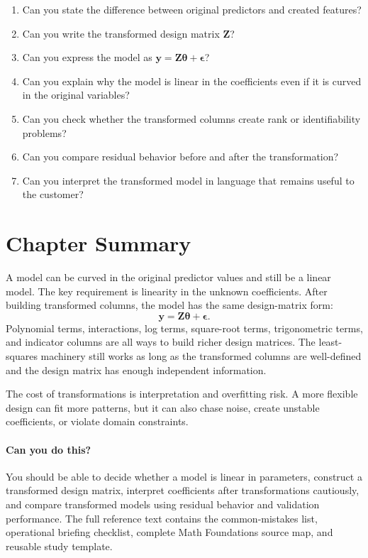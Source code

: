 {\begin{enumerate}
  \item Can you state the difference between original predictors and created features?
  \item Can you write the transformed design matrix \(\mathbf{Z}\)?
  \item Can you express the model as \(\mathbf{y}=\mathbf{Z}\boldsymbol{\theta}+\boldsymbol{\epsilon}\)?
  \item Can you explain why the model is linear in the coefficients even if it is curved in the original variables?
  \item Can you check whether the transformed columns create rank or identifiability problems?
  \item Can you compare residual behavior before and after the transformation?
  \item Can you interpret the transformed model in language that remains useful to the customer?
\end{enumerate}
}{
\section{Chapter Summary}

A model can be curved in the original predictor values and still be a linear model.  The key requirement is linearity in the unknown coefficients.  After building transformed columns, the model has the same design-matrix form:
\begin{equation}
  \mathbf{y}=\mathbf{Z}\boldsymbol{\theta}+\boldsymbol{\epsilon}.
\end{equation}
Polynomial terms, interactions, log terms, square-root terms, trigonometric terms, and indicator columns are all ways to build richer design matrices.  The least-squares machinery still works as long as the transformed columns are well-defined and the design matrix has enough independent information.

The cost of transformations is interpretation and overfitting risk.  A more flexible design can fit more patterns, but it can also chase noise, create unstable coefficients, or violate domain constraints.

\paragraph{Can you do this?}
You should be able to decide whether a model is linear in parameters, construct a transformed design matrix, interpret coefficients after transformations cautiously, and compare transformed models using residual behavior and validation performance.  The full reference text contains the common-mistakes list, operational briefing checklist, complete Math Foundations source map, and reusable study template.
}
